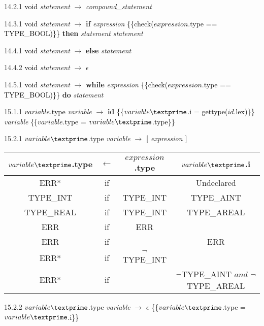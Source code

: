 14.2.1 \textcolor{black}{void} \emph{statement} $\rightarrow$ \emph{compound\_statement}

14.3.1 \textcolor{black}{void} \emph{statement} $\rightarrow$ \textbf{if} \emph{expression} \textcolor{black}{\{\{check($expression$.type == TYPE\_BOOL)\}\}} \textbf{then} \emph{statement} \emph{statement\textprime}

14.4.1 \textcolor{black}{void} \emph{statement\textprime} $\rightarrow$ \textbf{else} \emph{statement}

14.4.2 \textcolor{black}{void} \emph{statement\textprime} $\rightarrow$ $\epsilon$

14.5.1 \textcolor{black}{void} \emph{statement} $\rightarrow$ \textbf{while} \emph{expression} \textcolor{black}{\{\{check($expression$.type == TYPE\_BOOL)\}\}} \textbf{do} \emph{statement}

15.1.1 \textcolor{black}{$variable$.type} \emph{variable} $\rightarrow$ \textbf{id} \textcolor{black}{\{\{$variable\textprime$.i = gettype($id$.lex)\}\}} \emph{variable\textprime} \textcolor{black}{\{\{$variable$.type = $variable\textprime$.type\}\}}

15.2.1 \textcolor{black}{$variable\textprime$.type} \emph{variable\textprime} $\rightarrow$ \textbf{[} \emph{expression} \textbf{]}

\begin{tabular}[t]{|c|c|c|c|}
  \hline

  $variable\textprime$.type & \textbf{$\leftarrow$} & $expression$.type & $variable\textprime$.i \\

  \hline

  ERR* & if & & Undeclared \\
  TYPE\_INT & if & TYPE\_INT & TYPE\_AINT \\
  TYPE\_REAL & if & TYPE\_INT & TYPE\_AREAL \\
  ERR & if & ERR & \\
  ERR & if & & ERR \\
  ERR* & if & $\neg$TYPE\_INT & \\
  ERR* & if & & $\neg$TYPE\_AINT $and$ $\neg$TYPE\_AREAL \\

  \hline

\end{tabular}


15.2.2 \textcolor{black}{$variable\textprime$.type} \emph{variable\textprime} $\rightarrow$ $\epsilon$ \textcolor{black}{\{\{$variable\textprime$.type = $variable\textprime$.i\}\}}

